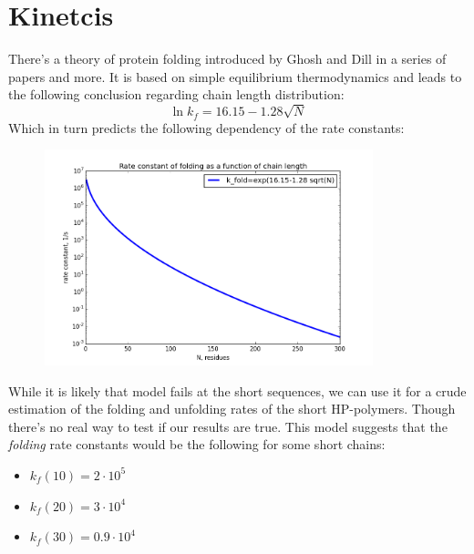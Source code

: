 \documentclass[12pt]{paper}
\begin{document}
\section{Kinetcis}
There's a theory of protein folding introduced by Ghosh and Dill in a series of papers 
\cite{Ghosh2010,Dill2011} and more. It is based on simple equilibrium thermodynamics and leads to 
the following conclusion regarding chain length distribution:
  \begin{equation}\label{eq:lnk}
   \ln k_f=16.15-1.28 \sqrt{N}
  \end{equation} 
Which in turn predicts the following dependency of the rate constants:
\begin{figure}[h!]
  \centering
  \includegraphics[width=0.85\textwidth]{pictures/k_fold_N.png} 
  \caption{}
  \label{fig:k_fold_N}
\end{figure}
While it is likely that model fails at the short sequences, we can use it for a crude estimation 
of the folding and unfolding rates of the short HP-polymers. Though there's no real way to test if 
our results are true.
This model suggests that the \textit{folding} rate constants would be the following for some short 
chains:
  \begin{itemize}
   \item $k_f(10)=2\cdot 10^5$
   \item $k_f(20)=3\cdot 10^4$
   \item $k_f(30)=0.9\cdot 10^4$
  \end{itemize}
\end{document}
